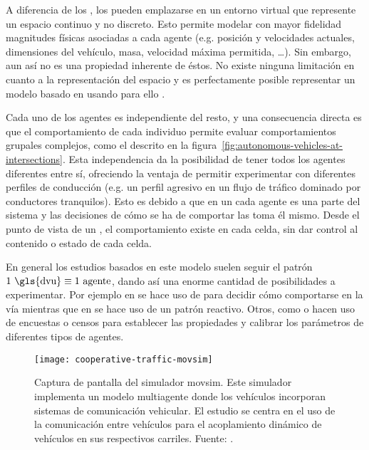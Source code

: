 A diferencia de los , los  pueden emplazarse en un entorno virtual que represente un espacio continuo y no discreto. Esto permite modelar con mayor fidelidad magnitudes físicas asociadas a cada agente (e.g. posición y velocidades actuales, dimensiones del vehículo, masa, velocidad máxima permitida, \ldots). Sin embargo, aun así no es una propiedad inherente de éstos. No existe ninguna limitación en cuanto a la representación del espacio y es perfectamente posible representar un modelo basado en  usando para ello .

Cada uno de los agentes es independiente del resto, y una consecuencia directa es que el comportamiento de cada individuo permite evaluar comportamientos grupales complejos, como el descrito en la figura~\ref{fig:autonomous-vehicles-at-intersections}. Esta independencia da la posibilidad de tener todos los agentes diferentes entre sí, ofreciendo la ventaja de permitir experimentar con diferentes perfiles de conducción (e.g. un perfil agresivo en un flujo de tráfico dominado por conductores tranquilos). Esto es debido a que en un  cada agente es una parte del sistema y las decisiones de cómo se ha de comportar las toma él mismo. Desde el punto de vista de un , el comportamiento existe en cada celda, sin dar control al contenido o estado de cada celda.

En general los estudios basados en este modelo suelen seguir el patrón $1 \text{ \gls{dvu}\index{driver-vehicle unit}} \equiv 1 \text{ agente}$, dando así una enorme cantidad de posibilidades a experimentar. Por ejemplo en \cite{Das} se hace uso de  para decidir cómo comportarse en la vía mientras que en \cite{Ehlert2001} se hace uso de un patrón reactivo. Otros, como \cite{Dia2002} o \cite{Balmer} hacen uso de encuestas o censos para establecer las propiedades y calibrar los parámetros de diferentes tipos de agentes.

\begin{figure}
	\centering
	\texttt{[image: cooperative-traffic-movsim]}
	\caption[Captura de pantalla del simulador \gls{movsim}]{Captura de pantalla del simulador \gls{movsim}. Este simulador implementa un modelo multiagente donde los vehículos incorporan sistemas de comunicación vehicular. El estudio se centra en el uso de la comunicación entre vehículos para el acoplamiento dinámico de vehículos en sus respectivos carriles. Fuente: \cite{Gu2015}.}
	\label{fig:cooperative-traffic-movsim}
\end{figure}


